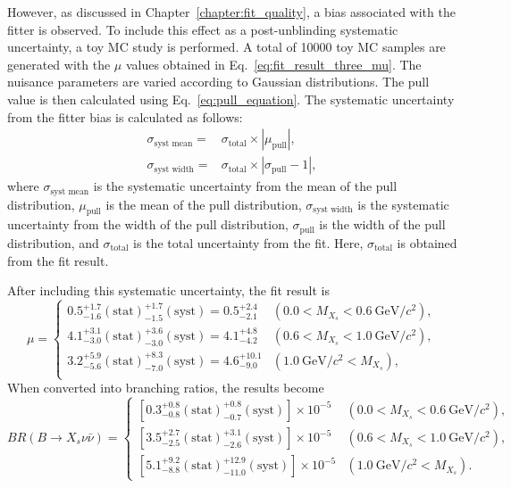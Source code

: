 However, as discussed in Chapter~\ref{chapter:fit_quality}, a bias associated with the fitter is observed.
To include this effect as a post-unblinding systematic uncertainty, a toy MC study is performed.
A total of 10000 toy MC samples are generated with the $\mu$ values obtained in Eq.~\ref{eq:fit_result_three_mu}.
The nuisance parameters are varied according to Gaussian distributions.
The pull value is then calculated using Eq.~\ref{eq:pull_equation}.
The systematic uncertainty from the fitter bias is calculated as follows:
\begin{align}
    \sigma_{\textrm{syst mean}} =& \sigma_{\textrm{total}} \times \left| \mu_{\textrm{pull}} \right|,\\
    \sigma_{\textrm{syst width}} =& \sigma_{\textrm{total}} \times \left| \sigma_{\textrm{pull}} - 1 \right|,
\end{align}
where $\sigma_{\textrm{syst mean}}$ is the systematic uncertainty from the mean of the pull distribution, $\mu_{\textrm{pull}}$ is the mean of the pull distribution, $\sigma_{\textrm{syst width}}$ is the systematic uncertainty from the width of the pull distribution, $\sigma_{\textrm{pull}}$ is the width of the pull distribution, and $\sigma_{\textrm{total}}$ is the total uncertainty from the fit.
Here, $\sigma_{\textrm{total}}$ is obtained from the fit result.

After including this systematic uncertainty, the fit result is
\begin{equation}
    \mu = 
  \begin{cases}
    0.5^{+1.7}_{-1.6}(\textrm{stat})^{+1.7}_{-1.5}(\textrm{syst})=0.5^{+2.4}_{-2.1} & (0.0 < M_{X_{s}} < 0.6~\textrm{GeV}/c^{2}), \\[10pt]
    4.1^{+3.1}_{-3.0}(\textrm{stat})^{+3.6}_{-3.0}(\textrm{syst})=4.1^{+4.8}_{-4.2} & (0.6 < M_{X_{s}} < 1.0~\textrm{GeV}/c^{2}), \\[10pt]
    3.2^{+5.9}_{-5.6}(\textrm{stat})^{+8.3}_{-7.0}(\textrm{syst})=4.6^{+10.1}_{-9.0} & (1.0~\textrm{GeV}/c^{2} < M_{X_{s}}), \\
\end{cases}
\end{equation}
When converted into branching ratios, the results become
\begin{equation}
    BR(B\rightarrow X_{s} \nu \bar{\nu}) = 
  \begin{cases}
    [0.3^{+0.8}_{-0.8}(\textrm{stat})^{+0.8}_{-0.7}(\textrm{syst})]\times 10^{-5} & (0.0 < M_{X_{s}} < 0.6~\textrm{GeV}/c^{2}), \\[10pt]
    [3.5^{+2.7}_{-2.5}(\textrm{stat})^{+3.1}_{-2.6}(\textrm{syst})]\times 10^{-5} & (0.6 < M_{X_{s}} < 1.0~\textrm{GeV}/c^{2}), \\[10pt]
    [5.1^{+9.2}_{-8.8}(\textrm{stat})^{+12.9}_{-11.0}(\textrm{syst})]\times 10^{-5} & (1.0~\textrm{GeV}/c^{2} < M_{X_{s}}).
  \end{cases}
\end{equation}

